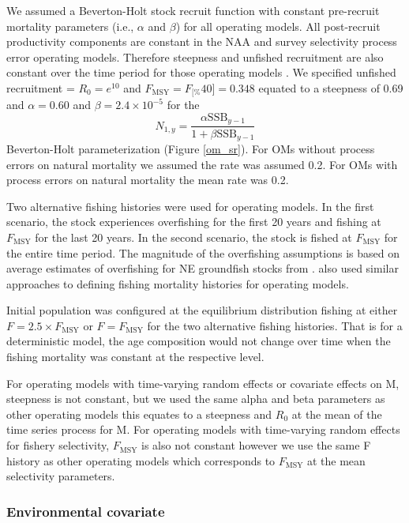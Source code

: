 \documentclass[
  12pt,
]{article}
\newcommand{\Fmsy}{\ensuremath{F_{\text{MSY}}}\xspace}
\newcommand{\Fspr}[1]{\ensuremath{F_{\text{{#1}\%}}}\xspace}
\begin{document}
We assumed a Beverton-Holt stock recruit function with constant
pre-recruit mortality parameters (i.e., \(\alpha\) and \(\beta\)) for
all operating models. All post-recruit productivity components are
constant in the NAA and survey selectivity process error operating
models. Therefore steepness and unfished recruitment are also constant
over the time period for those operating models \citep{millerbrooks21}.
We specified unfished recruitment = \(R_0 = e^{10}\) and
\(\Fmsy = \Fspr[40] = 0.348\) equated to a steepness of 0.69 and
\(\alpha=0.60\) and \(\beta = 2.4 \times 10^{-5}\) for the \[
N_{1,y} = \frac{\alpha \text{SSB}_{y-1}}{1 + \beta \text{SSB}_{y-1}} 
\] Beverton-Holt parameterization (Figure \ref{om_sr}). For OMs without
process errors on natural mortality we assumed the rate was assumed 0.2.
For OMs with process errors on natural mortality the mean rate was 0.2.

Two alternative fishing histories were used for operating models. In the
first scenario, the stock experiences overfishing for the first 20 years
and fishing at \Fmsy for the last 20 years. In the second scenario, the
stock is fished at \Fmsy for the entire time period. The magnitude of
the overfishing assumptions is based on average estimates of overfishing
for NE groundfish stocks from \citet{wiedenmannetal19}.
 also used similar approaches to defining fishing
mortality histories for operating models.

Initial population was configured at the equilibrium distribution
fishing at either \(F = 2.5\times \Fmsy\) or \(F = \Fmsy\) for the two
alternative fishing histories. That is for a deterministic model, the
age composition would not change over time when the fishing mortality
was constant at the respective level.

For operating models with time-varying random effects or covariate
effects on M, steepness is not constant, but we used the same alpha and
beta parameters as other operating models this equates to a steepness
and \(R_0\) at the mean of the time series process for M. For operating
models with time-varying random effects for fishery selectivity,
\Fmsy is also not constant however we use the same F history as other
operating models which corresponds to \Fmsy at the mean selectivity
parameters.

\hypertarget{environmental-covariate}{%
\subsubsection*{Environmental covariate}\label{environmental-covariate}}
\end{document}
